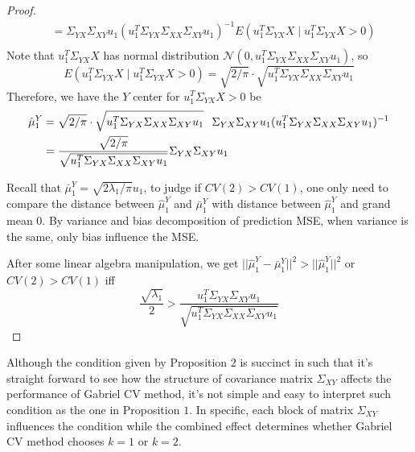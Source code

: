 \documentclass[12pt]{article}
\begin{document}
\begin{proof}
\begin{align}
 		      & =  \Sigma_{YX}\Sigma_{XY}u_1 (u^T_1\Sigma_{YX} \Sigma_{XX} \Sigma_{XY} u_1)^{-1} E(u^T_1\Sigma_{YX}X \mid u^T_1\Sigma_{YX}X>0) \\ \nonumber
\end{align}
Note that $u^T_1\Sigma_{YX}X$ has normal distribution $\mathcal{N} \left( 0, u^T_1\Sigma_{YX} \Sigma_{XX} \Sigma_{XY} u_1\right)$, so
\[
E(u^T_1\Sigma_{YX}X \mid u^T_1\Sigma_{YX}X>0) = \sqrt{2/\pi}\cdot\sqrt{u^T_1\Sigma_{YX} \Sigma_{XX} \Sigma_{XY} u_1}
\]
Therefore, we have the $Y$ center for $u^T_1\Sigma_{YX}X>0$ be
\begin{align*}
\hat{\mu}^Y_1 &= \sqrt{2/\pi}\cdot\sqrt{u^T_1\Sigma_{YX} \Sigma_{XX} \Sigma_{XY} u_1} \hspace{0.1in} \Sigma_{YX}\Sigma_{XY}u_1 (u^T_1\Sigma_{YX} \Sigma_{XX} \Sigma_{XY} u_1)^{-1} \\
&=\frac{\sqrt{2/\pi}}{\sqrt{u^T_1\Sigma_{YX} \Sigma_{XX} \Sigma_{XY} u_1}} \Sigma_{YX}\Sigma_{XY}u_1
\end{align*} 
 
Recall that $\bar{\mu}^Y_1 =\sqrt{2 \lambda_1/\pi}u_1$, to judge if $CV(2) > CV(1)$, one only need to compare the distance between  $\hat{\mu}^Y_1$  and  $\bar{\mu}^Y_1$ with distance between  $\hat{\mu}^Y_1$ and grand mean $0$. By variance and bias decomposition of prediction MSE, when variance is the same, only bias influence the MSE. 

After some linear algebra manipulation, we get
$||\hat{\mu}^Y_1 - \bar{\mu}^Y_1||^2 > ||\hat{\mu}^Y_1||^2$ or $CV(2) > CV(1)$ iff
\[
 \frac{\sqrt{\lambda_1}}{2} > \frac{u^T_1\Sigma_{YX}\Sigma_{XY}u_1}{\sqrt{u^T_1\Sigma_{YX} \Sigma_{XX} \Sigma_{XY} u_1}} 
\]
\end{proof}

Although the condition given by Proposition $2$ is succinct in such that it's straight forward to see how
the structure of covariance matrix $\Sigma_{XY}$ affects the performance of Gabriel CV method, it's not simple and easy to interpret such condition as the one in Proposition $1$. In specific, each block of matrix $\Sigma_{XY}$ influences the condition while the combined effect
determines whether Gabriel CV method chooses $k=1$ or $k=2$.
\end{document}

